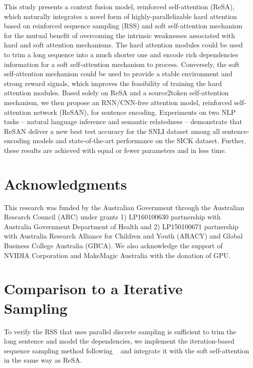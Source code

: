 \documentclass{article}
\begin{document}
This study presents a context fusion model, reinforced self-attention (ReSA), which naturally integrates a novel form of highly-parallelizable hard attention based on reinforced sequence sampling (RSS) and soft self-attention mechanism for the mutual benefit of overcoming the intrinsic weaknesses associated with hard and soft attention mechanisms. The hard attention modules could be used to trim a long sequence into a much shorter one and encode rich dependencies information for a soft self-attention mechanism to process. Conversely, the soft self-attention mechanism could be used to provide a stable environment and strong reward signals, which improves the feasibility of training the hard attention modules. Based solely on ReSA and a source2token self-attention mechanism,  we then propose an RNN/CNN-free attention model, reinforced self-attention network (ReSAN), for sentence encoding.  Experiments on two NLP tasks – natural language inference and semantic relatedness – demonstrate that ReSAN deliver a new best test accuracy for the SNLI dataset among all sentence-encoding models and state-of-the-art performance on the SICK dataset. Further, these results are achieved with equal or fewer parameters and in less time.

\section*{Acknowledgments}
This research was funded by the Australian Government through the Australian Research Council (ARC) under grants 1) LP160100630 partnership with Australia Government Department of Health and 2) LP150100671 partnership with Australia Research Alliance for Children and Youth (ARACY) and Global Business College Australia (GBCA).
We also acknowledge the support of NVIDIA Corporation and MakeMagic Australia with the donation of GPU.


{\small }


\newpage
\appendix

\section{Comparison to a Iterative Sampling} \label{ext:comparison}

To verify the RSS that uses parallel discrete sampling is sufficient to trim the long sentence and model the dependencies, we implement the iteration-based sequence sampling method following  \citeauthor{lei2016rationalizing}~ and integrate it with the soft self-attention in the same way as ReSA. 
\end{document}
